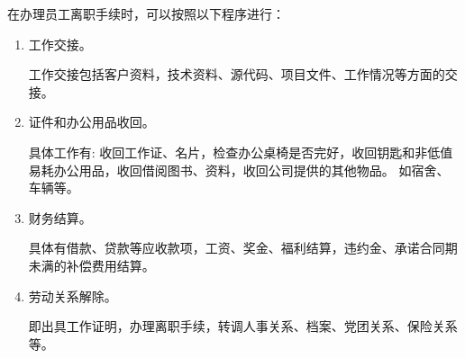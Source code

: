     在办理员工离职手续时，可以按照以下程序进行：

    \begin{enumerate}
        \item 工作交接。

        工作交接包括客户资料，技术资料、源代码、项目文件、工作情况等方面的交接。

        \item 证件和办公用品收回。

        具体工作有: 收回工作证、名片，检查办公桌椅是否完好，收回钥匙和非低值易耗办公用品，收回借阅图书、资料，收回公司提供的其他物品。 如宿舍、车辆等。

        \item 财务结算。

        具体有借款、贷款等应收款项，工资、奖金、福利结算，违约金、承诺合同期未满的补偿费用结算。

        \item 劳动关系解除。

        即出具工作证明，办理离职手续，转调人事关系、档案、党团关系、保险关系等。
    \end{enumerate}
